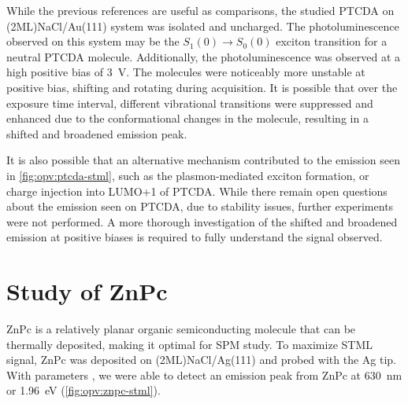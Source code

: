 While the previous references are useful as comparisons, the studied PTCDA on (2ML)NaCl/Au(111) system was isolated and uncharged. The photoluminescence observed on this system may be the $S_1(0) \rightarrow S_0(0)$ exciton transition for a neutral PTCDA molecule. Additionally, the photoluminescence was observed at a high positive bias of \SI{3}{V}. The molecules were noticeably more unstable at positive bias, shifting and rotating during acquisition. It is possible that over the exposure time interval, different vibrational transitions were suppressed and enhanced due to the conformational changes in the molecule, resulting in a shifted and broadened emission peak. 

It is also possible that an alternative mechanism contributed to the emission seen in \autoref{fig:opv:ptcda-stml}, such as the plasmon-mediated exciton formation, or charge injection into LUMO+1 of PTCDA. While there remain open questions about the emission seen on PTCDA, due to stability issues, further experiments were not performed. A more thorough investigation of the shifted and broadened emission at positive biases is required to fully understand the signal observed.



\section{Study of {ZnPc}}

\ac{ZnPc} is a relatively planar organic semiconducting molecule that can be thermally deposited, making it optimal for \ac{SPM} study. To maximize \ac{STML} signal, ZnPc was deposited on (2ML)NaCl/Ag(111) and probed with the Ag tip. With parameters , we were able to detect an emission peak from ZnPc at \SI{630}{nm} or \SI{1.96}{eV} (\autoref{fig:opv:znpc-stml}).




